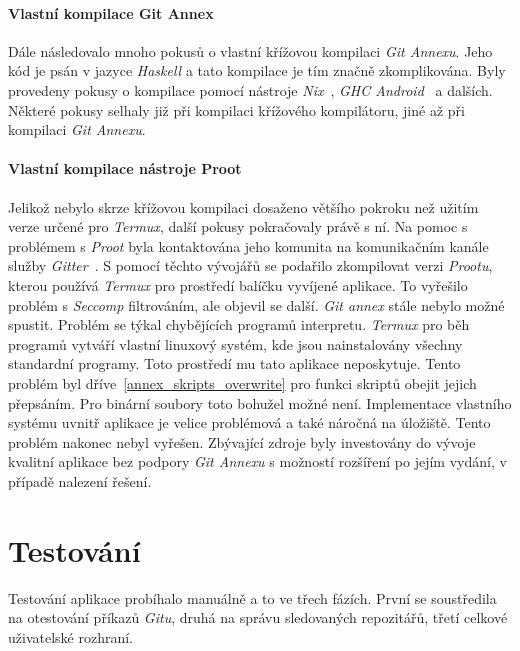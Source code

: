     \subsubsection{Vlastní kompilace Git Annex}
    Dále následovalo mnoho pokusů o vlastní křížovou kompilaci \emph{Git Annexu}. Jeho kód je psán v jazyce \emph{Haskell} a tato kompilace je tím značně zkomplikována. Byly provedeny pokusy o kompilace pomocí nástroje \emph{Nix}~, \emph{GHC Android}~ a dalších. Některé pokusy selhaly již při kompilaci křížového kompilátoru, jiné až při kompilaci \emph{Git Annexu}.

    \subsubsection{Vlastní kompilace nástroje Proot}
    Jelikož nebylo skrze křížovou kompilaci dosaženo většího pokroku než užitím verze určené pro \emph{Termux}, další pokusy pokračovaly právě s ní. Na pomoc s problémem s \emph{Proot} byla kontaktována jeho komunita na komunikačním kanále služby \emph{Gitter}~. S pomocí těchto vývojářů se podařilo zkompilovat verzi \emph{Prootu}, kterou používá \emph{Termux} pro prostředí balíčku vyvíjené aplikace. To vyřešilo problém s \emph{Seccomp} filtrováním, ale objevil se další. \emph{Git annex} stále nebylo možné spustit. Problém se týkal chybějících programů interpretu. \emph{Termux} pro běh programů vytváří vlastní linuxový systém, kde jsou nainstalovány všechny standardní programy. Toto prostředí mu tato aplikace neposkytuje. Tento problém byl dříve~\ref{annex_skripts_overwrite} pro funkci skriptů obejit jejich přepsáním. Pro binární soubory toto bohužel možné není. Implementace vlastního systému uvnitř aplikace je velice problémová a také náročná na úložiště. Tento problém nakonec nebyl vyřešen. Zbývající zdroje byly investovány do vývoje kvalitní aplikace bez podpory \emph{Git Annexu} s možností rozšíření po jejím vydání, v případě nalezení řešení.

\chapter{Testování}
Testování aplikace probíhalo manuálně a to ve třech fázích. První se soustředila na otestování příkazů \emph{Gitu}, druhá na správu sledovaných repozitářů, třetí celkové uživatelské rozhraní.

